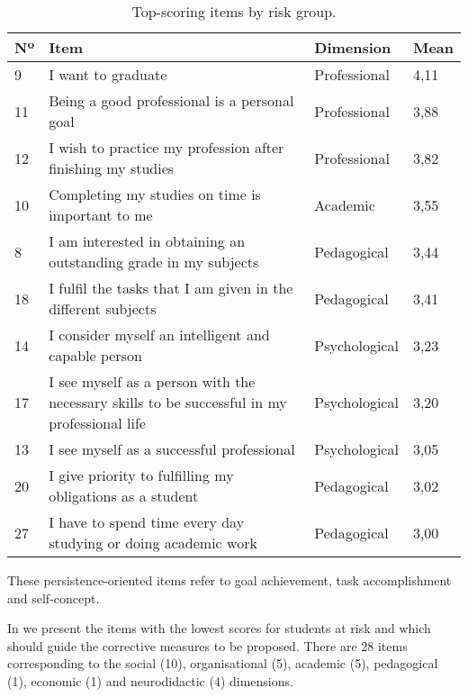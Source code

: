 \documentclass[english]{textolivre}
\begin{document}
\begin{table}[htbp]
\centering
\begin{threeparttable}
\caption{Top-scoring items by risk group.}
\label{tab05}
\begin{tabular}{p{1cm} p{7cm} p{2cm} p{2cm}}
\toprule
Nº & Item & Dimension & Mean \\
\midrule
9 & I want to graduate  & Professional & 4,11   \\
11 & Being a good professional is a personal goal & Professional & 3,88 \\
12 & I wish to practice my profession after finishing my studies & Professional & 3,82 \\
10 & Completing my studies on time is important to me & Academic & 3,55 \\
8 & I am interested in obtaining an outstanding grade in my subjects & Pedagogical & 3,44 \\
18 & I fulfil the tasks that I am given in the different subjects & Pedagogical & 3,41 \\
14 & I consider myself an intelligent and capable person  & Psychological & 3,23 \\
17 & I see myself as a person with the necessary skills to be successful in my professional life & Psychological & 3,20 \\
13 & I see myself as a successful professional & Psychological & 3,05 \\
20 & I give priority to fulfilling my obligations as a student & Pedagogical & 3,02 \\
27 & I have to spend time every day studying or doing academic work & Pedagogical & 3,00 \\
\bottomrule
\end{tabular}
\end{threeparttable}
\end{table}

These persistence-oriented items refer to goal achievement, task accomplishment and self-concept.

In  we present the items with the lowest scores for students at risk and which should guide the corrective measures to be proposed. There are 28 items corresponding to the social (10), organisational (5), academic (5), pedagogical (1), economic (1) and neurodidactic (4) dimensions.
\end{document}

